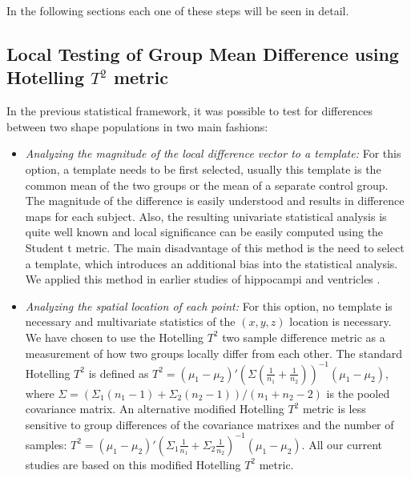 \documentclass{InsightArticle}
\begin{document}
In the following sections each one of these steps will be seen in detail.

\subsection{Local Testing of Group Mean Difference using Hotelling $T^2$ metric}
\label{sec:TestMethods}

In the previous statistical framework, it was possible to test for differences between two shape populations in two main fashions:

\begin{itemize}
\item \emph{Analyzing the magnitude of the local difference vector to a template:} For this option, a template needs to be first selected, usually this template is the common mean of the two groups or the mean of a separate control group.  The magnitude of the difference is easily understood and results in difference maps for each subject. Also, the resulting univariate statistical analysis is quite well known and local significance can be easily computed using the Student t metric. The main disadvantage of this method is the need to select a template, which introduces an additional bias into the statistical analysis. We applied this method in earlier studies of hippocampi \cite{Styner04MedIA} and ventricles \cite{Styner05PNAS}.
\item \emph{Analyzing the spatial location of each point:} For this option, no template is necessary and multivariate statistics of the $(x,y,z)$ location is necessary. We have chosen to use the Hotelling $T^2$ two sample difference metric as a measurement of how two groups locally differ from each other. The standard Hotelling $T^2$ is defined as 
$T^2 = (\mu_1 - \mu_2)' (\Sigma (\frac{1}{n_1} + \frac{1}{n_2}))^{-1} (\mu_1 - \mu_2)$, where $\Sigma = (\Sigma_1 (n_1 -1) + \Sigma_2 (n_2 -1))/ (n_1 +n_2 -2)$ is the pooled covariance matrix. An alternative modified Hotelling $T^2$ metric is less sensitive to group differences of the covariance matrixes and the number of samples\cite{Seber04}: $T^2 = (\mu_1 - \mu_2)' (\Sigma_1 \frac{1}{n_1} + \Sigma_2 \frac{1}{n_2})^{-1} (\mu_1 - \mu_2)$. All our current studies are based on this modified Hotelling $T^2$ metric.
\end{itemize}
\end{document}
